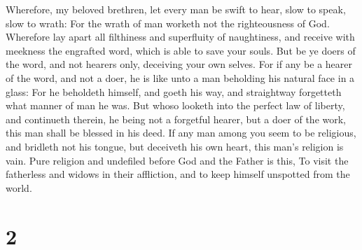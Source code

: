  Wherefore, my beloved brethren, let every man be swift
to hear, slow to speak, slow to wrath:  For the wrath of
man worketh not the righteousness of God.  Wherefore lay
apart all filthiness and superfluity of naughtiness, and receive with
meekness the engrafted word, which is able to save your souls.
 But be ye doers of the word, and not hearers only,
deceiving your own selves.  For if any be a hearer of the
word, and not a doer, he is like unto a man beholding his natural face
in a glass:  For he beholdeth himself, and goeth his way,
and straightway forgetteth what manner of man he was. 
But whoso looketh into the perfect law of liberty, and continueth
therein, he being not a forgetful hearer, but a doer of the work, this
man shall be blessed in his deed.  If any man among you
seem to be religious, and bridleth not his tongue, but deceiveth his own
heart, this man's religion is vain.  Pure religion and
undefiled before God and the Father is this, To visit the fatherless and
widows in their affliction, and to keep himself unspotted from the
world.

\hypertarget{section-1}{%
\section{2}\label{section-1}}

